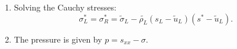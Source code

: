 \documentclass[review]{elsarticle}
\begin{document}
\begin{enumerate}
\begin{enumerate}
    \item Solving the Cauchy stresses:
\begin{equation*}
  \sigma_L^*=\sigma_R^*=\widetilde{\sigma}_L -\widetilde{\rho_L} (s_L-\widetilde{u}_L)(s^*-\widetilde{u}_L).
\end{equation*}

     \item The pressure is given by $p =s_{xx}-\sigma$.
  \end{enumerate}
\end{enumerate}
\end{document}
